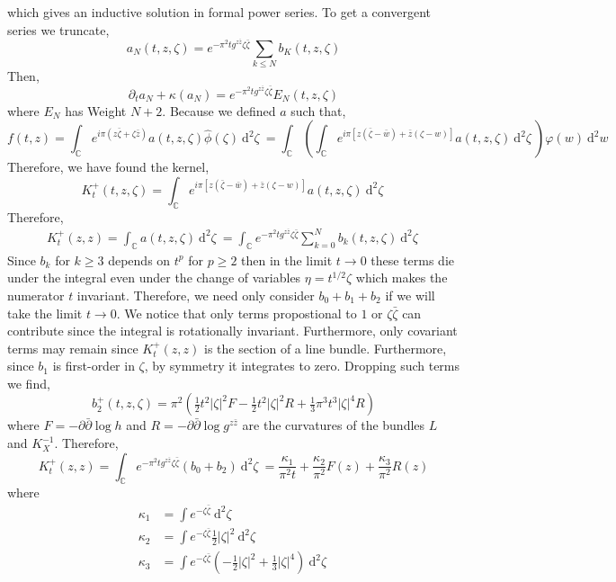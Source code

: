 \documentclass[12pt]{extarticle}
\newcommand{\C}{\mathbb{C}}
\newcommand{\dn}[2]{\: \mathrm{d}^{#1} #2 \:}
\theoremstyle{definition}
\begin{document}
which gives an inductive solution in formal power series. To get a convergent series we truncate,
\[ a_N(t, z, \zeta) = e^{- \pi^2 t g^{z \bar{z}} \zeta \bar{\zeta}} \sum_{k \le N} b_K(t, z, \zeta) \]
Then,
\[ \partial_t a_N + \kappa(a_N) = e^{- \pi^2 t g^{z \bar{z}} \zeta \bar{\zeta}} E_N(t, z, \zeta) \]
where $E_N$ has Weight $N + 2$. Because we defined $a$ such that,
\[ f(t, z) = \int_{\C} e^{i \pi (z \bar{\zeta} + \zeta \bar{z})} a(t, z, \zeta) \hat{\phi}(\zeta) \dn{2}{\zeta} = \int_{\C} \left( \int_{\C} e^{i \pi[z ( \bar{\zeta} - \bar{w}) + \bar{z} (\zeta - w)]} a(t, z, \zeta) \dn{2}{\zeta} \right)  \varphi(w) \dn{2}{w} \]
Therefore, we have found the kernel,
\[ K^+_t(t, z, \zeta) =  \int_{\C} e^{i \pi[z ( \bar{\zeta} - \bar{w}) + \bar{z} (\zeta - w)]} a(t, z, \zeta) \dn{2}{\zeta} \]
Therefore,
\begin{align*}
K^{+}_t(z,z) = \int_{\C} a(t, z, \zeta) \dn{2}{\zeta} = \int_{\C} e^{- \pi^2 t g^{z \bar{z}} \zeta \bar{\zeta}} \sum_{k = 0}^N b_k(t, z, \zeta) \dn{2}{\zeta}  
\end{align*}
Since $b_k$ for $k \ge 3$ depends on $t^{p}$ for $p \ge 2$ then in the limit $t \to 0$ these terms die under the integral even under the change of variables $\eta = t^{1/2} \zeta$ which makes the numerator $t$ invariant. Therefore, we need only consider $b_0 + b_1 + b_2$ if we will take the limit $t \to 0$. We notice that only terms propostional to $1$ or $\zeta \bar{\zeta}$ can contribute since the integral is rotationally invariant. Furthermore, only covariant terms may remain since $K^{+}_t(z,z)$ is the section of a line bundle. Furthermore, since $b_1$ is first-order in $\zeta$, by symmetry it integrates to zero. Dropping such terms we find,
\[ b_2^{+}(t, z, \zeta) = \pi^2 \left( \tfrac{1}{2} t^2 |\zeta|^2 F - \tfrac{1}{2} t^2 |\zeta|^2 R + \tfrac{1}{3} \pi^3 t^3 |\zeta|^4 R \right) \] 
where $F = - \partial \bar{\partial} \log{h}$ and $R = - \partial \bar{\partial} \log{g^{z \bar{z}}}$ are the curvatures of the bundles $L$ and $K_X^{-1}$. 
Therefore,
\[ K^{+}_t(z,z) = \int_{\C} e^{- \pi^2 t g^{z \bar{z}} \zeta \bar{\zeta}} (b_0 + b_2) \dn{2}{\zeta} = \frac{\kappa_1}{\pi^2 t} + \frac{\kappa_2}{\pi^2} F(z) + \frac{\kappa_3}{\pi^2} R(z) \]
where
\begin{align*}
\kappa_1 & = \int e^{- \zeta \bar{\zeta}} \dn{2}{\zeta} 
\\
\kappa_2 & = \int e^{- \zeta \bar{\zeta}} \tfrac{1}{2} |\zeta|^2 \dn{2}{\zeta} 
\\
\kappa_3 & = \int e^{- \zeta \bar{\zeta}} \left( - \frac{1}{2} |\zeta|^2 + \tfrac{1}{3} |\zeta|^4  \right) \dn{2}{\zeta} 
\end{align*}
\end{document}
